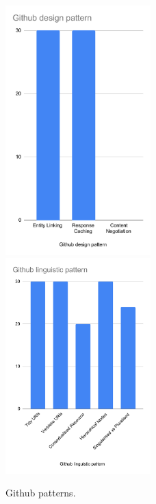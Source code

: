 \begin{figure}[htb!]
\includegraphics[width=0.5\textwidth]{img/exampleBars/githubDesPatt.pdf}
\includegraphics[width=0.5\textwidth]{img/exampleBars/githubLingPatt.pdf}
\caption{Github patterns.}
\label{fig:githubBarPattEx}
\end{figure}

